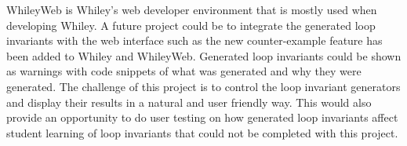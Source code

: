 WhileyWeb is Whiley's web developer environment that is mostly used when
developing Whiley.
A future project could be to integrate the generated loop invariants with
the web interface such as the new counter-example feature has been added to
Whiley and WhileyWeb.
Generated loop invariants could be shown as warnings with code snippets of what
was generated and why they were generated.
The challenge of this project is to control the loop invariant
generators and display their results in a natural and user friendly way.
This would also provide an opportunity to do user testing on how generated
loop invariants affect student learning of loop invariants that could not be
completed with this project.